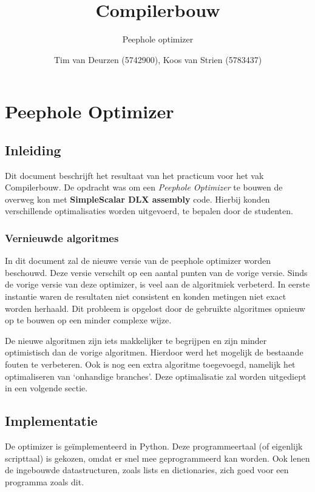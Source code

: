 \documentclass[11pt, a4paper]{uva_report}
\institute{Universiteit van Amsterdam}
\title{Compilerbouw}
\subtitle{Peephole optimizer}
\author{Tim van Deurzen (5742900), Koos van Strien (5783437)}
\begin{document}
\maketitle

\chapter{Peephole Optimizer}

    \section{Inleiding}
        Dit document beschrijft het resultaat van het practicum voor het vak
        Compilerbouw. De opdracht was om een \emph{Peephole Optimizer} te bouwen
        de overweg kon met {\bf SimpleScalar DLX assembly} code. Hierbij konden
        verschillende optimalisaties worden uitgevoerd, te bepalen door de
        studenten.
    
    
        \subsection{Vernieuwde algoritmes}
        In dit document zal de nieuwe versie van de peephole optimizer worden
        beschouwd. Deze versie verschilt op een aantal punten van de vorige
        versie.  Sinds de vorige versie van deze optimizer, is veel aan de
        algoritmiek verbeterd. In eerste instantie waren de resultaten niet
        consistent en konden metingen niet exact worden herhaald. Dit probleem
        is opgelost door de gebruikte algoritmes opnieuw op te bouwen op een
        minder complexe wijze. 

        De nieuwe algoritmen zijn iets makkelijker te begrijpen en zijn minder
        optimistisch dan de vorige algoritmen. Hierdoor werd het mogelijk de
        bestaande fouten te verbeteren. Ook is nog een extra algoritme
        toegevoegd, namelijk het optimaliseren van `onhandige branches'. Deze
        optimalisatie zal worden uitgediept in een volgende sectie.


    \section{Implementatie}
        De optimizer is ge\"implementeerd in Python. Deze programmeertaal (of
        eigenlijk scripttaal) is gekozen, omdat er snel mee geprogrammeerd kan
        worden. Ook lenen de ingebouwde datastructuren, zoals lists en
        dictionaries, zich goed voor een programma zoals dit.
\end{document}
